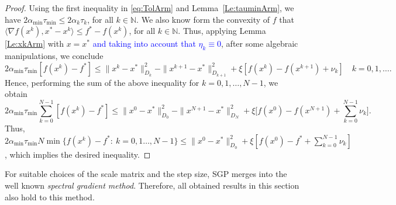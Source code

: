 \begin{proof}
	Using the first inequality in \eqref{eq:TolArm} and Lemma~\ref{Le:tauminArm}, we have $2 \alpha_{\min} \tau_{\min} \leq 2 \alpha_k \tau_k$, for all $k\in {\mathbb N}$. We also know form the convexity of $f$ that $\langle \nabla f(x^k), x^*-x^k \rangle \leq f^* - f(x^k)$, for all $k\in {\mathbb N}$. Thus, applying Lemma \ref{Le:xkArm} with $x=x^*$ \textcolor{blue}{and taking into account that $\eta_k\equiv 0$},  after some algebraic manipulations, we conclude
	$$
		2 \alpha_{\min} \tau_{\min} \left[f(x^k)-f^*\right] \leq \|x^k-x^*\|_{D_k}^2-\|x^{k+1}-x^*\|_{D_{k+1}}^2 + \xi \left[f(x^k) - f(x^{k+1})+\nu_k \right] \quad k = 0, 1, \ldots.
	$$
	Hence, performing the sum of the above inequality for $k = 0,1,\ldots, N-1$, we obtain
	$$
		2 \alpha_{\min} \tau_{\min}\sum_{k=0}^{N-1} \left[f(x^k)-f^*\right] \leq \|x^0-x^*\|_{D_0}^2-\|x^{N+1}-x^*\|_{D_{N}}^2 + \xi\Big[f(x^0)-f(x^{N+1})+ \sum_{k=0}^{N-1} \nu_k\Big].
	$$
	Thus, $2\alpha_{\min} \tau_{\min} N \min\{f(x^k) - f^*:~ k = 0, 1 \ldots, N-1\} \leq \|x^0 - x^*\|^2_{D_0}+ \xi[f(x^0)-f^*+ \sum_{k=0}^{N-1} \nu_k]$, which implies the desired inequality.
\end{proof}
\begin{remark}
For suitable choices  of the scale matrix  and the step size,  SGP merges into the well known {\it spectral gradient method}. Therefore, all obtained results in this section  also hold to this method.
\end{remark}